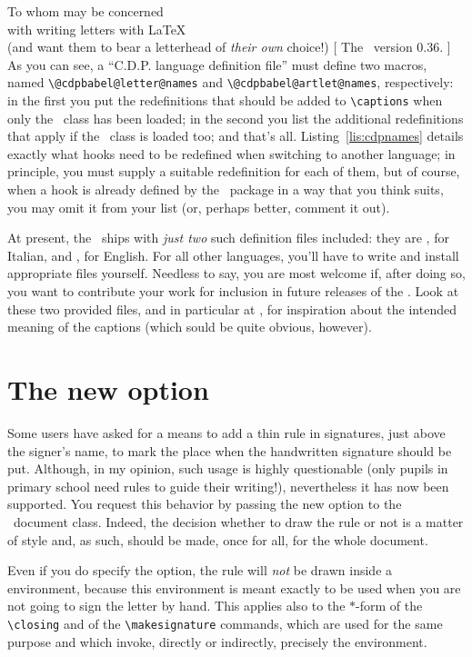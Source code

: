 \begin{letterhead}{
	To whom may be concerned\\
	with writing letters with \LaTeX\\
	(and want them to bear a letterhead
	of \emph{their own} choice!)
}[
	The \Bundle\ version 0.36.
]
As you can see, a ``C.D.P. language definition file'' must define two macros,
named \verb|\@cdpbabel@letter@names| and \verb|\@cdpbabel@artlet@names|,
respectively: in the first you put the redefinitions that should be added to
\verb|\captions| when only the \lcdp\ class has been loaded; in
the second you list the additional redefinitions that apply if the \acdp\ class
is loaded too; and that's all.  Listing~\ref{lis:cdpnames} details exactly what
hooks need to be redefined when switching to another language; in principle, you
must supply a suitable redefinition for each of them, but of course, when a hook
is already defined by the \babel\ package in a way that you think suits, you may
omit it from your list (or, perhaps better, comment it out).

At present, the \Bundle\ ships with \emph{just two} such definition files
included: they are , for Italian, and
, for English.  For all other languages, you'll
have to write and install appropriate files yourself.  Needless to say, you are
most welcome if, after doing so, you want to contribute your work for inclusion
in future releases of the \Bundle.  Look at these two provided files, and in
particular at , for inspiration about the intended
meaning of the captions (which sould be quite obvious, however).



\section{The new  option}
\label{S:Options}

Some users have asked for a means to add a thin rule in signatures, just above
the signer's name, to mark the place when the handwritten signature should be
put.  Although, in my opinion, such usage is highly questionable (only pupils in
primary school need rules to guide their writing!\@), nevertheless it has now
been supported.  You request this behavior by passing the new
 option to the \lcdp\ document class.  Indeed, the decision
whether to draw the rule or not is a matter of style and, as such, should be
made, once for all, for the whole document.

Even if you do specify the  option, the rule will \emph{not}
be drawn inside a  environment, because this environment is
meant exactly to be used when you are not going to sign the letter by hand.
This applies also to the \mbox{$*$-form} of the \verb|\closing| and of the
\verb|\makesignature| commands, which are used for the same purpose and which
invoke, directly or indirectly, precisely the  environment.


\end{letterhead}

